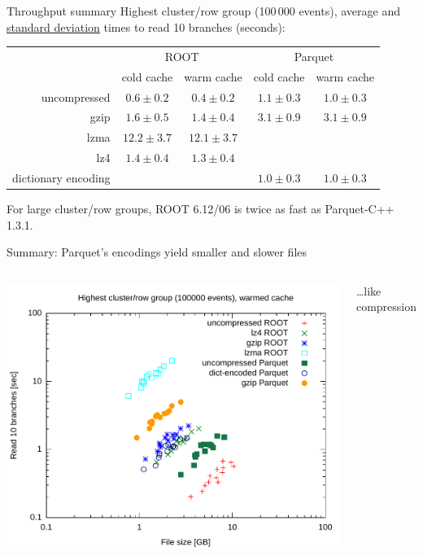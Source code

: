 \documentclass[aspectratio=169]{beamer}
\begin{document}
\begin{frame}{Throughput summary}
\vspace{0.35 cm}
Highest cluster/row group (100\,000 events), average and \underline{standard deviation} times to read 10 branches (seconds):

\renewcommand{\arraystretch}{1.2}

\begin{center}
\begin{tabular}{r c c | c c}
                    & \multicolumn{2}{c}{ROOT} & \multicolumn{2}{c}{Parquet} \\
                    &  cold cache    &  warm cache    & cold cache    & warm cache    \\\hline
uncompressed        &  $0.6 \pm 0.2$ &  $0.4 \pm 0.2$ & $1.1 \pm 0.3$ & $1.0 \pm 0.3$ \\
gzip                &  $1.6 \pm 0.5$ &  $1.4 \pm 0.4$ & $3.1 \pm 0.9$ & $3.1 \pm 0.9$ \\
lzma                & $12.2 \pm 3.7$ & $12.1 \pm 3.7$ &               &               \\
lz4                 &  $1.4 \pm 0.4$ &  $1.3 \pm 0.4$ &               &               \\
dictionary encoding &                &                & $1.0 \pm 0.3$ & $1.0 \pm 0.3$ \\
\end{tabular}
\end{center}

\vspace{0.25 cm}
For large cluster/row groups, ROOT 6.12/06 is twice as fast as Parquet-C++ 1.3.1.
\end{frame}

\begin{frame}{Summary: Parquet's encodings yield smaller and slower files}
\vspace{0.15 cm}\Large
\begin{columns}
\includegraphics[width=\linewidth]{root-parquet-size-throughput.pdf}

\ldots like compression
\end{columns}
\end{frame}
\end{document}
